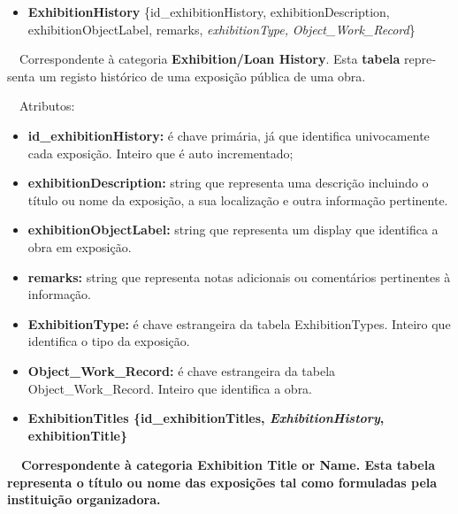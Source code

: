 \documentclass[letterpaper]{article}
\newcommand\textstyleStrongEmphasis[1]{\textbf{#1}}
\newcommand\liststyleLi{%
\renewcommand\labelitemi{{\textbullet}}
\renewcommand\labelitemii{[27A2?]}
\renewcommand\labelitemiii{{\textbullet}}
\renewcommand\labelitemiv{{\textbullet}}
}
\newcommand\liststyleLxiv{%
\renewcommand\labelitemi{[27A2?]}
\renewcommand\labelitemii{[27A2?]}
\renewcommand\labelitemiii{[27A2?]}
\renewcommand\labelitemiv{[27A2?]}
}
\begin{document}
\bigskip

\liststyleLi
\begin{itemize}
\item {
\textbf{ExhibitionHistory }\{id\_exhibitionHistory,
exhibitionDescription, exhibitionObjectLabel, remarks,
\textit{exhibitionType,} \textit{Object\_Work\_Record}\}}
\end{itemize}
{
\foreignlanguage{english}{\ \ Correspondente \`a categoria
}\foreignlanguage{english}{\textbf{Exhibition}}\textstyleStrongEmphasis{\foreignlanguage{english}{/Loan
History}}\foreignlanguage{english}{. Esta
}\textstyleStrongEmphasis{\foreignlanguage{english}{\textmd{tabela}}}\foreignlanguage{english}{
representa um registo hist\'orico de uma exposi\c{c}\~ao p\'ublica de
uma obra.}}


\bigskip

{
\ \ Atributos:}

\liststyleLxiv
\begin{itemize}
\item {
\textbf{id\_exhibitionHistory: }\'e chave prim\'aria, j\'a que
identifica univocamente cada exposi\c{c}\~ao. Inteiro que \'e auto
incrementado;}
\item {
\textbf{exhibitionDescription: }string que representa uma
descri\c{c}\~ao incluindo o t\'itulo ou nome da exposi\c{c}\~ao, a sua
localiza\c{c}\~ao e outra informa\c{c}\~ao pertinente.}
\item {
\textbf{exhibitionObjectLabel: }string que representa um display que
identifica a obra em exposi\c{c}\~ao.}
\item {
\textbf{remarks:} string que representa notas adicionais ou
coment\'arios pertinentes \`a informa\c{c}\~ao.}
\item {
\textbf{ExhibitionType:} \'e chave estrangeira da tabela
ExhibitionTypes. Inteiro que identifica o tipo da exposi\c{c}\~ao.}
\item {
\textbf{Object\_Work\_Record:}\textit{ }\'e chave estrangeira da tabela
Object\_Work\_Record. Inteiro que identifica a obra.\ \ }
\end{itemize}

\bigskip

\liststyleLi
\begin{itemize}
\item {\bfseries
ExhibitionTitles\textmd{ \{}\textmd{id\_exhibitionTitles}\textmd{,
}\textmd{\textit{ExhibitionHistory}}\textmd{, exhibitionTitle\}}}
\end{itemize}
{\bfseries
\foreignlanguage{english}{\textmd{\ \ Correspondente \`a categoria
}}\foreignlanguage{english}{Exhibition}\textstyleStrongEmphasis{\foreignlanguage{english}{
Title or Name}}\foreignlanguage{english}{\textmd{. Esta
}}\textstyleStrongEmphasis{\foreignlanguage{english}{\textmd{tabela}}}\foreignlanguage{english}{\textmd{
representa o t\'itulo ou nome das exposi\c{c}\~oes tal como formuladas
pela institui\c{c}\~ao organizadora.}}}
\end{document}
